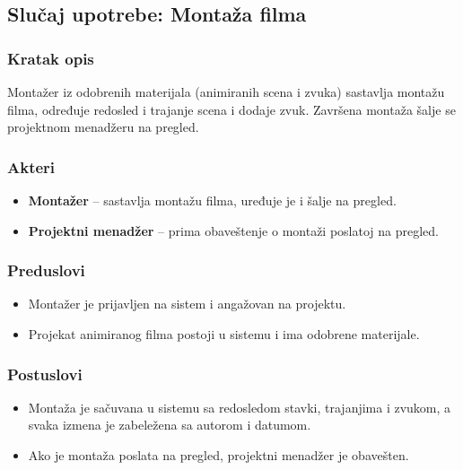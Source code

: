 \subsection{Slučaj upotrebe: Montaža filma}

\subsubsection*{Kratak opis}

Montažer iz odobrenih materijala (animiranih scena i zvuka) sastavlja montažu filma, određuje redosled i trajanje scena i dodaje zvuk. Završena montaža šalje se projektnom menadžeru na pregled.

\subsubsection*{Akteri}
\begin{itemize}
    \item \textbf{Montažer} -- sastavlja montažu filma, uređuje je i šalje na pregled.
    \item \textbf{Projektni menadžer} -- prima obaveštenje o montaži poslatoj na pregled.
\end{itemize}

\subsubsection*{Preduslovi}
\begin{itemize}
    \item Montažer je prijavljen na sistem i angažovan na projektu.
    \item Projekat animiranog filma postoji u sistemu i ima odobrene materijale.
\end{itemize}

\subsubsection*{Postuslovi}
\begin{itemize}
    \item Montaža je sačuvana u sistemu sa redosledom stavki, trajanjima i zvukom, a svaka izmena je zabeležena sa autorom i datumom.
    \item Ako je montaža poslata na pregled, projektni menadžer je obavešten.
\end{itemize}

